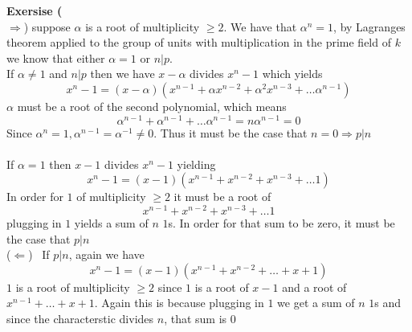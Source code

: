\documentclass[12pt]{article}
\newenvironment{ques}[1]{\textbf{Exersise #1}\vspace{1 mm}\\ }{\bigskip}
\theoremstyle{definition}
\renewcommand{\a}{\alpha}
\begin{document}
\begin{ques}{2.6}
	($\Rightarrow$) suppose $\a$ is a root of multiplicity $\geq 2$. We have
	that $\a^n = 1$, by Lagranges theorem applied to the group of units with
	multiplication in the prime field of $k$ we know that either $\a = 1$ or $n|p$.\\
	If $\a \neq 1$ and $n|p$ then we have $x-\a$ divides $x^n - 1$ which yields
	$$x^n - 1 = (x - \a)(x^{n-1} + \a x^{n-2} + \a^2x^{n-3} + \dots \a^{n-1})$$
	$\a$ must be a root of the second polynomial, which means
	$$\a^{n-1} + \a^{n-1} + \dots \a^{n-1} = n\a^{n-1} = 0$$
	Since $\a^n = 1, \a^{n-1} = \a^{-1} \neq 0$. Thus it must be the case that
	$n = 0 \Rightarrow p|n$\\
	\\
	If $\a = 1$ then $x - 1$ divides $x^n - 1$ yielding
	$$x^n - 1 = (x - 1)(x^{n-1} + x^{n-2} + x^{n-3} + \dots 1)$$
	In order for $1$ of multiplicity $\geq 2$ it must be a root of 
	$$x^{n-1} + x^{n-2} + x^{n-3} + \dots 1$$
	plugging in $1$ yields a sum of $n$ $1$s. In order for that sum to be zero,
	it must be the case that $p|n$
	\\
	($\Leftarrow$) \ If $p | n$, again we have
	$$x^n - 1 = (x - 1)(x^{n-1} + x^{n-2} + \dots + x + 1)$$
	$1$ is a root of multiplicity $\geq 2$ since $1$ is a root of $x - 1$ and
	a root of $x^{n-1} + \dots + x + 1$. Again this is because plugging in $1$ we get
	a sum of $n$ $1$s and since the characterstic divides $n$, that sum is $0$
\end{ques}
\end{document}
